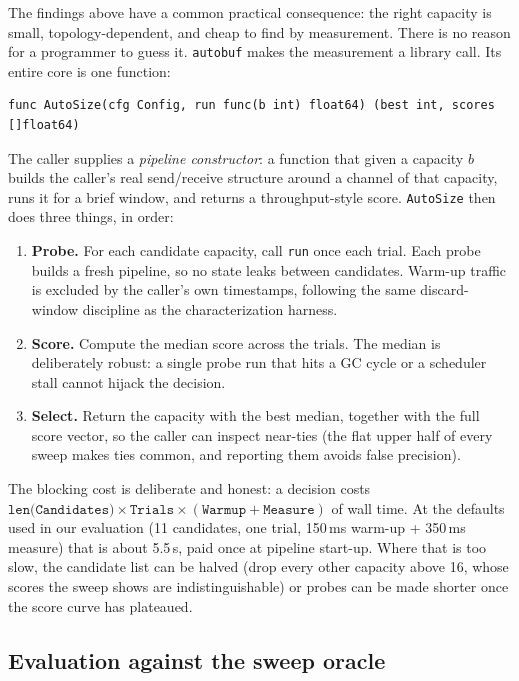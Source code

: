 \documentclass[10pt,a4paper]{article}
\begin{document}
The findings above have a common practical consequence: the right capacity is
small, topology-dependent, and cheap to find by measurement. There is no reason
for a programmer to guess it. \texttt{autobuf} makes the measurement a library
call. Its entire core is one function:

\begin{lstlisting}
func AutoSize(cfg Config, run func(b int) float64) (best int, scores []float64)
\end{lstlisting}

\noindent The caller supplies a \emph{pipeline constructor}: a function that
given a capacity $b$ builds the caller's real send/receive structure around a
channel of that capacity, runs it for a brief window, and returns a
throughput-style score. \texttt{AutoSize} then does three things, in order:

\begin{enumerate}
  \item \textbf{Probe.} For each candidate capacity, call \texttt{run} once
        each trial. Each probe builds a fresh pipeline, so no state leaks
        between candidates. Warm-up traffic is excluded by the caller's own
        timestamps, following the same discard-window discipline as the
        characterization harness.
  \item \textbf{Score.} Compute the median score across the trials. The median
        is deliberately robust: a single probe run that hits a GC cycle or a
        scheduler stall cannot hijack the decision.
  \item \textbf{Select.} Return the capacity with the best median, together
        with the full score vector, so the caller can inspect near-ties (the
        flat upper half of every sweep makes ties common, and reporting them
        avoids false precision).
\end{enumerate}

The blocking cost is deliberate and honest: a decision costs
$\texttt{len(Candidates)} \times \texttt{Trials} \times (\texttt{Warmup} +
\texttt{Measure})$ of wall time. At the defaults used in our evaluation
(11 candidates, one trial, 150\,ms warm-up + 350\,ms measure) that is about
5.5\,s, paid once at pipeline start-up. Where that is too slow, the candidate
list can be halved (drop every other capacity above 16, whose scores the sweep
shows are indistinguishable) or probes can be made shorter once the score curve
has plateaued.

\subsection{Evaluation against the sweep oracle}
\label{sec:tuner-eval}
\end{document}
